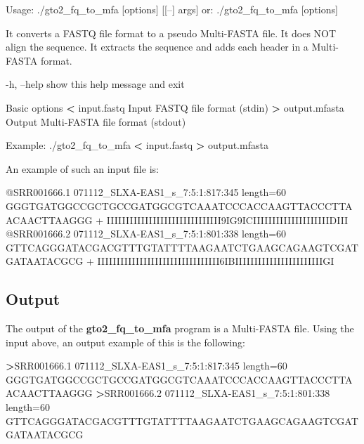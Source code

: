 \documentclass[11pt,]{krantz}
\newenvironment{Shaded}{\begin{snugshade}}{\end{snugshade}}
\newcommand{\OperatorTok}[1]{\textcolor[rgb]{0.43,0.43,0.43}{\textbf{#1}}}
\newcommand{\ExtensionTok}[1]{#1}
\newcommand{\NormalTok}[1]{#1}
\begin{document}
\begin{Shaded}
\begin{Highlighting}[]
\ExtensionTok{Usage}\NormalTok{: ./gto2_fq_to_mfa [options] [[--] args]}
   \ExtensionTok{or}\NormalTok{: ./gto2_fq_to_mfa [options]}

\ExtensionTok{It}\NormalTok{ converts a FASTQ file format to a pseudo Multi-FASTA }
\ExtensionTok{file.}\NormalTok{ It does NOT align the sequence. It extracts the }
\ExtensionTok{sequence}\NormalTok{ and adds each header in a Multi-FASTA format.}

    \ExtensionTok{-h}\NormalTok{, --help       show this help message and exit}

\ExtensionTok{Basic}\NormalTok{ options}
    \OperatorTok{<} \ExtensionTok{input.fastq}\NormalTok{    Input FASTQ file format (stdin)}
    \OperatorTok{>} \ExtensionTok{output.mfasta}\NormalTok{  Output Multi-FASTA file format (stdout)}

\ExtensionTok{Example}\NormalTok{: ./gto2_fq_to_mfa }\OperatorTok{<}\NormalTok{ input.fastq }\OperatorTok{>}\NormalTok{ output.mfasta}
\end{Highlighting}
\end{Shaded}

An example of such an input file is:

\begin{Shaded}
\begin{Highlighting}[]
\ExtensionTok{@SRR001666.1}\NormalTok{ 071112_SLXA-EAS1_s_7:5:1:817:345 length=60}
\ExtensionTok{GGGTGATGGCCGCTGCCGATGGCGTCAAATCCCACCAAGTTACCCTTAACAACTTAAGGG}
\ExtensionTok{+}
\ExtensionTok{IIIIIIIIIIIIIIIIIIIIIIIIIIIIII9IG9ICIIIIIIIIIIIIIIIIIIIIDIII}
\ExtensionTok{@SRR001666.2}\NormalTok{ 071112_SLXA-EAS1_s_7:5:1:801:338 length=60}
\ExtensionTok{GTTCAGGGATACGACGTTTGTATTTTAAGAATCTGAAGCAGAAGTCGATGATAATACGCG}
\ExtensionTok{+}
\ExtensionTok{IIIIIIIIIIIIIIIIIIIIIIIIIIIIIIII6IBIIIIIIIIIIIIIIIIIIIIIIIGI}
\end{Highlighting}
\end{Shaded}

\subsection*{Output}\label{output-1}


The output of the \textbf{gto2\_fq\_to\_mfa} program is a Multi-FASTA
file. Using the input above, an output example of this is the following:

\begin{Shaded}
\begin{Highlighting}[]
\OperatorTok{>}\ExtensionTok{SRR001666.1}\NormalTok{ 071112_SLXA-EAS1_s_7:5:1:817:345 length=60}
\ExtensionTok{GGGTGATGGCCGCTGCCGATGGCGTCAAATCCCACCAAGTTACCCTTAACAACTTAAGGG}
\OperatorTok{>}\ExtensionTok{SRR001666.2}\NormalTok{ 071112_SLXA-EAS1_s_7:5:1:801:338 length=60}
\ExtensionTok{GTTCAGGGATACGACGTTTGTATTTTAAGAATCTGAAGCAGAAGTCGATGATAATACGCG}
\end{Highlighting}
\end{Shaded}
\end{document}
